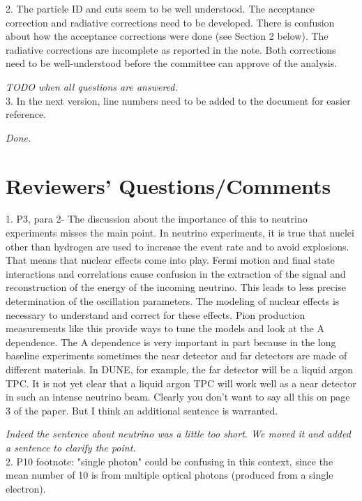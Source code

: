 \documentclass[12pt]{article}
\begin{document}
2.
The particle ID and cuts seem to be well understood.  The acceptance correction and 
radiative corrections need to be developed.  There is confusion about how the acceptance 
corrections were done (see Section 2 below).  The radiative corrections are incomplete as 
reported in the note.  Both corrections need to be well-understood before the committee can 
approve of the analysis.

{\it TODO when all questions are answered.} \\

3.
In the next version, line numbers need to be added to the document for easier reference.

{\it Done.} \\

\section{Reviewers’ Questions/Comments}
1.
P3, para 2- The discussion about the importance of this to neutrino experiments misses the 
main point.  In neutrino experiments, it is true that nuclei other than hydrogen are used to 
increase the event rate and to avoid explosions.  That means that nuclear effects come into 
play.  Fermi motion and final state interactions and correlations cause confusion in the 
extraction of the signal and reconstruction of the energy of the incoming neutrino.  This 
leads to less precise determination of the oscillation parameters.  The modeling of nuclear 
effects is necessary to understand and correct for these effects.  Pion production 
measurements like this provide ways to tune the models and look at the A dependence.  The 
A dependence is very important in part because in the long baseline experiments sometimes 
the near detector and far detectors are made of different materials.  In DUNE, for example, 
the far detector will be a liquid argon TPC.  It is not yet clear that a liquid argon TPC will 
work well as a near detector in such an intense neutrino beam.  Clearly you don’t want to 
say all this on page 3 of the paper.  But I think an additional sentence is warranted.

{\it Indeed the sentence about neutrino was a little too short. We moved it and added a 
sentence to clarify the point.}\\



2.
P10 footnote: "single photon" could be confusing in this context, since the mean number of 
10 is from multiple optical photons (produced from a single electron).
\end{document}
